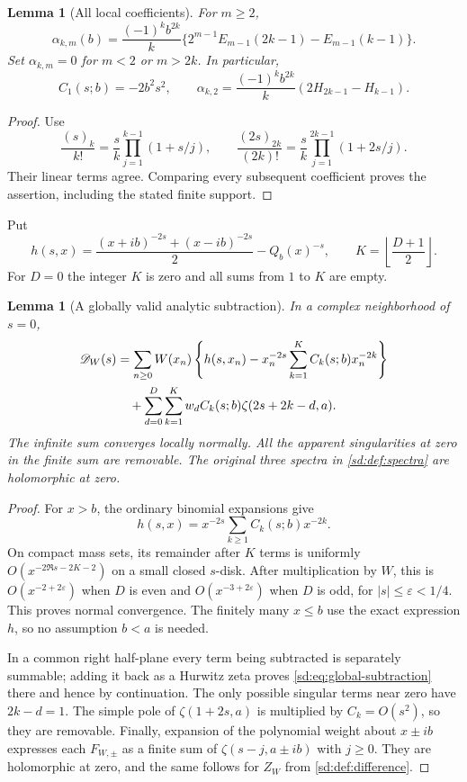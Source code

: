 \documentclass[11pt,a4paper]{article}
\numberwithin{equation}{section}
\newtheorem{lemma}[theorem]{Lemma}
\theoremstyle{definition}
\theoremstyle{remark}
\begin{document}
\begin{lemma}[All local coefficients]\label{sd:lem:coefficients}
For $m\ge2$,
\begin{equation}\label{sd:eq:alpha}
 \alpha_{k,m}(b)=\frac{(-1)^kb^{2k}}{k}
       \{2^{m-1}E_{m-1}(2k-1)-E_{m-1}(k-1)\}.
\end{equation}
Set $\alpha_{k,m}=0$ for $m<2$ or $m>2k$.  In particular,
\[
 C_1(s;b)=-2b^2s^2,\qquad
 \alpha_{k,2}=\frac{(-1)^kb^{2k}}k
                    (2H_{2k-1}-H_{k-1}).
\]
\end{lemma}
\begin{proof}
Use
\[
 \frac{(s)_k}{k!}=\frac{s}{k}
                    \prod_{j=1}^{k-1}(1+s/j),\qquad
 \frac{(2s)_{2k}}{(2k)!}=\frac{s}{k}
                    \prod_{j=1}^{2k-1}(1+2s/j).
\]
Their linear terms agree.  Comparing every subsequent coefficient
proves the assertion, including the stated finite support.
\end{proof}

Put
\begin{equation}\label{sd:eq:h}
 h(s,x)=\frac{(x+ib)^{-2s}+(x-ib)^{-2s}}2-Q_b(x)^{-s},
 \qquad K=\left\lfloor\frac{D+1}{2}\right\rfloor.
\end{equation}
For $D=0$ the integer $K$ is zero and all sums from $1$ to $K$ are empty.

\begin{lemma}[A globally valid analytic subtraction]
\label{sd:lem:subtraction}
In a complex neighborhood of $s=0$,
\begin{align}
 \mathscr D_W(s)
 &=\sum_{n\ge0}W(x_n)
 \left\{h(s,x_n)-x_n^{-2s}
                  \sum_{k=1}^{K}C_k(s;b)x_n^{-2k}\right\}
 \notag\\
 &\quad+\sum_{d=0}^{D}\sum_{k=1}^{K}
         w_dC_k(s;b)\zeta(2s+2k-d,a).
 \label{sd:eq:global-subtraction}
\end{align}
The infinite sum converges locally normally.  All the apparent
singularities at zero in the finite sum are removable.  The original
three spectra in \eqref{sd:def:spectra} are holomorphic at zero.
\end{lemma}
\begin{proof}
For $x>b$, the ordinary binomial expansions give
\[
 h(s,x)=x^{-2s}\sum_{k\ge1}C_k(s;b)x^{-2k}.
\]
On compact mass sets, its remainder after $K$ terms is uniformly
$O(x^{-2\Re s-2K-2})$ on a small closed $s$-disk.  After multiplication
by $W$, this is $O(x^{-2+2\varepsilon})$ when $D$ is even and
$O(x^{-3+2\varepsilon})$ when $D$ is odd, for $|s|\le\varepsilon<1/4$.
This proves normal convergence.  The finitely many $x\le b$ use the
exact expression $h$, so no assumption $b<a$ is needed.

In a common right half-plane every term being subtracted is separately
summable; adding it back as a Hurwitz zeta proves
\eqref{sd:eq:global-subtraction} there and hence by continuation.
The only possible singular terms near zero have $2k-d=1$.
The simple pole of $\zeta(1+2s,a)$ is multiplied by $C_k=O(s^2)$,
so they are removable.  Finally, expansion of the polynomial weight
about $x\pm ib$ expresses each $F_{W,\pm}$ as a finite sum of
$\zeta(s-j,a\pm ib)$ with $j\ge0$.  They are holomorphic at zero,
and the same follows for $Z_W$ from \eqref{sd:def:difference}.
\end{proof}
\end{document}
